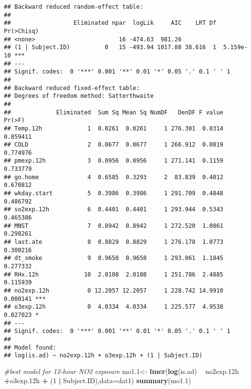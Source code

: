 \documentclass[12pt,]{article}
\newenvironment{Shaded}{\begin{snugshade}}{\end{snugshade}}
\newcommand{\CommentTok}[1]{\textcolor[rgb]{0.56,0.35,0.01}{\textit{#1}}}
\newcommand{\DataTypeTok}[1]{\textcolor[rgb]{0.13,0.29,0.53}{#1}}
\newcommand{\DecValTok}[1]{\textcolor[rgb]{0.00,0.00,0.81}{#1}}
\newcommand{\FloatTok}[1]{\textcolor[rgb]{0.00,0.00,0.81}{#1}}
\newcommand{\KeywordTok}[1]{\textcolor[rgb]{0.13,0.29,0.53}{\textbf{#1}}}
\newcommand{\NormalTok}[1]{#1}
\newcommand{\OperatorTok}[1]{\textcolor[rgb]{0.81,0.36,0.00}{\textbf{#1}}}
\newcommand{\StringTok}[1]{\textcolor[rgb]{0.31,0.60,0.02}{#1}}
\begin{document}
\begin{verbatim}
## Backward reduced random-effect table:
## 
##                  Eliminated npar  logLik     AIC    LRT Df Pr(>Chisq)    
## <none>                        16 -474.63  981.26                         
## (1 | Subject.ID)          0   15 -493.94 1017.88 38.616  1  5.159e-10 ***
## ---
## Signif. codes:  0 '***' 0.001 '**' 0.01 '*' 0.05 '.' 0.1 ' ' 1
## 
## Backward reduced fixed-effect table:
## Degrees of freedom method: Satterthwaite 
## 
##             Eliminated  Sum Sq Mean Sq NumDF   DenDF F value   Pr(>F)    
## Temp.12h             1  0.0261  0.0261     1 276.301  0.0314 0.859411    
## COLD                 2  0.0677  0.0677     1 266.912  0.0819 0.774976    
## pmexp.12h            3  0.0956  0.0956     1 271.141  0.1159 0.733779    
## go.home              4  0.6585  0.3293     2  83.839  0.4012 0.670812    
## wkday.start          5  0.3986  0.3986     1 291.709  0.4848 0.486792    
## so2exp.12h           6  0.4401  0.4401     1 293.944  0.5343 0.465386    
## MNST                 7  0.8942  0.8942     1 272.520  1.0861 0.298261    
## last.ate             8  0.8829  0.8829     1 276.178  1.0773 0.300216    
## dt_smoke             9  0.9658  0.9658     1 293.061  1.1845 0.277332    
## RHx.12h             10  2.0108  2.0108     1 251.786  2.4885 0.115939    
## no2exp.12h           0 12.2057 12.2057     1 228.742 14.9910 0.000141 ***
## o3exp.12h            0  4.0334  4.0334     1 225.577  4.9538 0.027023 *  
## ---
## Signif. codes:  0 '***' 0.001 '**' 0.01 '*' 0.05 '.' 0.1 ' ' 1
## 
## Model found:
## log(is.ad) ~ no2exp.12h + o3exp.12h + (1 | Subject.ID)
\end{verbatim}

\begin{Shaded}
\begin{Highlighting}[]
\CommentTok{#best model for 12-hour NO2 exposure}
\NormalTok{mo1}\FloatTok{.1}\NormalTok{<-}\StringTok{ }\KeywordTok{lmer}\NormalTok{(}\KeywordTok{log}\NormalTok{(is.ad) }\OperatorTok{~}\StringTok{ }\NormalTok{no2exp}\FloatTok{.12}\NormalTok{h }\OperatorTok{+}\NormalTok{o3exp}\FloatTok{.12}\NormalTok{h }\OperatorTok{+}\StringTok{ }\NormalTok{(}\DecValTok{1} \OperatorTok{|}\StringTok{ }\NormalTok{Subject.ID),}\DataTypeTok{data=}\NormalTok{dat1)}
\KeywordTok{summary}\NormalTok{(mo1}\FloatTok{.1}\NormalTok{)}
\end{Highlighting}
\end{Shaded}
\end{document}
